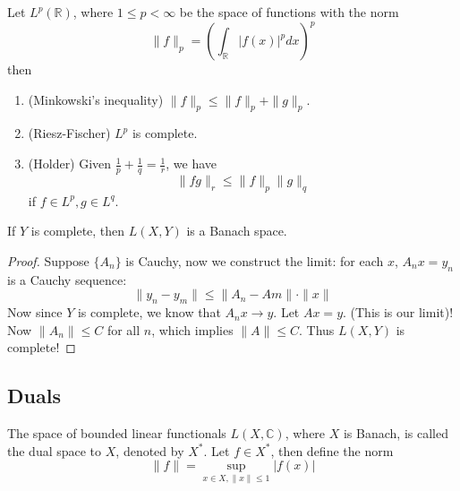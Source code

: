 \documentclass[openany]{book}
\newcommand{\R}{\mathbb{R}}
\newcommand{\C}{\mathbb{C}}
\begin{document}
\begin{prop}
    Let $L^p(\R)$, where $1\leq p<\infty$ be the space of functions with the norm 
    \begin{equation*}
        \|f\|_p=\left(\int_\R|f(x)|^pdx\right)^p
    \end{equation*}
    then 
    \begin{enumerate}
        \item (Minkowski's inequality) $\|f\|_p\leq\|f\|_p+\|g\|_p$.
        \item (Riesz-Fischer) $L^p$ is complete.
        \item (Holder) Given $\frac{1}{p}+\frac{1}{q}=\frac{1}{r}$, we have 
        \begin{equation*}
            \|fg\|_r\leq\|f\|_p\|g\|_q
        \end{equation*}
        if $f\in L^p, g\in L^q$.
    \end{enumerate}
\end{prop}


\begin{prop}
    If $Y$ is complete, then $L(X,Y)$ is a Banach space.
\end{prop}
\begin{proof}
    Suppose $\{A_n\}$ is Cauchy, now we construct the limit: for each $x$, $A_nx=y_n$ is a Cauchy sequence:
    \begin{equation*}
        \|y_n-y_m\|\leq\|A_n-Am\|\cdot\|x\|
    \end{equation*}
    Now since $Y$ is complete, we know that $A_nx\to y$. Let $Ax=y$. (This is our limit)! Now $\|A_n\|\leq C$ for all $n$, which implies $\|A\|\leq C$. Thus $L(X,Y)$ is complete!
\end{proof}

\subsection{Duals}
\begin{defn}
    The space of bounded linear functionals $L(X,\C)$, where $X$ is Banach, is called the dual space to $X$, denoted by $X^*$. Let $f\in X^*$, then define the norm 
    \begin{equation*}
        \|f\|=\sup_{x\in X, \|x\|\leq 1}|f(x)|
    \end{equation*}
\end{defn}
\end{document}

